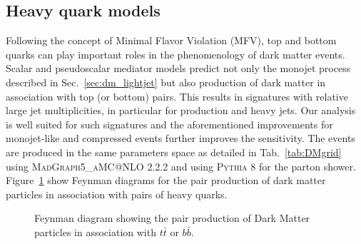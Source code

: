 

\clearpage
\subsection{Heavy quark models}
\label{sec:dm_heavyjet}

Following the concept of Minimal Flavor Violation (MFV), top and bottom quarks can play important roles in the phenomenology of dark matter events.
Scalar and pseudoscalar mediator models predict not only the monojet process described in Sec.~\ref{sec:dm_lightjet} but also production of dark matter in association
with top (or bottom) pairs. This results in signatures with relative large jet multiplicities, in particular for \DMtt production and heavy jets. Our \alphat analysis is well suited for such signatures and the aforementioned improvements for monojet-like and compressed events further improves the sensitivity. The events are produced in the same parameters space as detailed in Tab.~\ref{tab:DMgrid} using \textsc{MadGraph5\_aMC@NLO} 2.2.2 and using \textsc{Pythia 8} for the parton shower. Figure~\ref{fig:feynman_hf} show Feynman diagrams for the pair production of dark matter particles in association with pairs of heavy quarks.


\begin{figure}[h!]
  \centering
  \caption{Feynman diagram showing the pair production of Dark Matter particles in association with $t\bar{t}$ or $b\bar{b}$. \cite{Abercrombie:2015wmb}}
  \label{fig:feynman_hf}
\end{figure}


